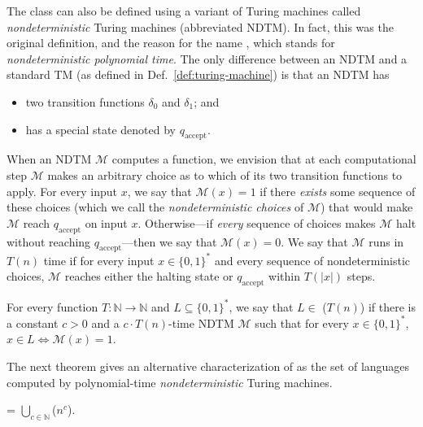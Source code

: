 The class \NP{} can also be defined using a variant of Turing machines called \emph{nondeterministic} Turing machines (abbreviated NDTM). In fact, this was the original definition, and the reason for the name \NP, which stands for \emph{nondeterministic polynomial time}. The only difference between an NDTM and a standard TM (as defined in Def.~\ref{def:turing-machine}) is that an NDTM has
\begin{itemize}
	\item two transition functions $\delta_0$ and $\delta_1$; and
	\item has a special state denoted by $q_{\text{accept}}$.
\end{itemize}
When an NDTM $\mathcal{M}$ computes a function, we envision that at each computational step $\mathcal{M}$ makes an arbitrary choice as to which of its two transition functions to apply. For every input $x$, we say that $\mathcal{M}(x) = 1$ if there \emph{exists} some sequence of these choices (which we call the \emph{nondeterministic choices} of $\mathcal{M}$) that would make $\mathcal{M}$ reach $q_{\text{accept}}$ on input $x$. Otherwise---if \emph{every} sequence of choices makes $\mathcal{M}$ halt without reaching $q_{\text{accept}}$---then we say that $\mathcal{M}(x) = 0$. We say that $\mathcal{M}$ runs in $T(n)$ time if for every input $x \in \{0,1\}^*$ and every sequence of nondeterministic choices, $\mathcal{M}$ reaches either the halting state or $q_{\text{accept}}$ within $T(|x|)$ steps.

\begin{definition}
	For every function $T : \mathbb{N} \to \mathbb{N}$ and $L \subseteq \{0,1\}^*$, we say that $L \in$ \NTIME($T(n)$) if there is a constant $c > 0$ and a $c \cdot T(n)$-time NDTM $\mathcal{M}$ such that for every $x \in \{0,1\}^*$, $x \in L \Leftrightarrow \mathcal{M}(x) = 1$.
\end{definition}

The next theorem gives an alternative characterization of \NP{} as the set of languages computed by polynomial-time \emph{nondeterministic} Turing machines.

\begin{theorem}
	\NP{} = $\bigcup_{c\in\mathbb{N}}$\NTIME($n^c$).
\end{theorem}

